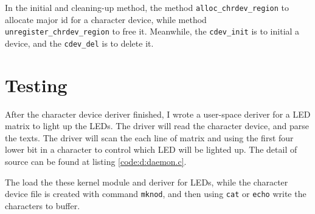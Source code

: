 \documentclass{report}
\begin{document}
    In the initial and cleaning-up method, the method \lstinline|alloc_chrdev_region|
    to allocate major id for a character device, while method \lstinline|unregister_chrdev_region|
    to free it. Meanwhile, the \lstinline|cdev_init| is to initial a device, and the
    \lstinline|cdev_del| is to delete it.
        
    \section{Testing}
    \label{chap:scd:test}
    
    After the character device deriver finished, I wrote a user-space deriver for a LED matrix to
    light up the LEDs.
    The driver will read the character device, and parse the texts.
    The driver will scan the each line of matrix and using the first four lower bit in a character to control which LED will be lighted up. The detail of source can be found at listing \ref{code:d:daemon.c}.
    
    The load the these kernel module and deriver for LEDs, while the character device file 
    is created with command \lstinline|mknod|, and then using \lstinline|cat| or 
    \lstinline|echo| write the characters to buffer.
    
    
    
\end{document}
